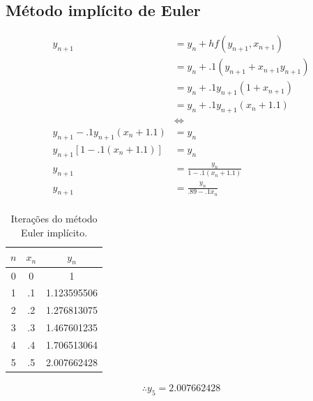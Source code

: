 \documentclass{article}
\begin{document}
	\subsection{Método implícito de Euler}
	\begin{align*}
		y_{n+1} &= y_n + hf(y_{n+1}, x_{n+1}) \\
		&= y_n + .1 (y_{n+1} + x_{n+1} y_{n+1}) \\
		&= y_n + .1 y_{n+1} (1 + x_{n+1}) \\
		&= y_n + .1 y_{n+1} (x_{n} + 1.1) \\
		&\iff \\
		y_{n+1} -.1 y_{n+1} (x_{n} + 1.1) &= y_n \\
		y_{n+1}[1 -.1 (x_{n} + 1.1)] &= y_n \\
		y_{n+1} &= \frac{y_n}{1 -.1 (x_{n} + 1.1)} \\
		y_{n+1} &= \frac{y_n}{.89 -.1x_{n}} \\
	\end{align*}
	\begin{table}[H]
		\centering
		\begin{tabular}{|c|c|c|}
			\hline
			$n$ & $x_n$ & $y_n$          \\\hline
			0       &  0    & 1      				      \\\hline
			1       & .1    & 1.123595506 \\\hline
			2       & .2    & 1.276813075 \\\hline
			3       & .3    & 1.467601235 \\\hline
			4       & .4    & 1.706513064 \\\hline
			5       & .5    & 2.007662428 \\\hline
		\end{tabular}
		
		\captionsetup{justification=centering}
		\caption{Iterações do método Euler implícito.}
	\end{table}
	\begin{align*}
	\therefore
	y_5 = 2.007662428
	\end{align*}
	
\end{document}
